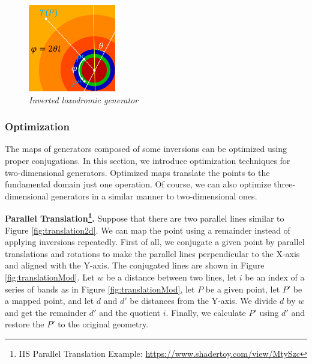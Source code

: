 \begin{figure}[h!tbp]
\begin{minipage}[t]{0.24\hsize}
   \label{fig:loxodromicMod}
 \end{minipage}
  \hspace*{\fill}
 \begin{minipage}[t]{0.24\hsize}
   \begin{center}
    \includegraphics[width=1.5in, height=1.5in, keepaspectratio]{./img/application/optimization/loxodromicModRotation.pdf}
   \end{center}
   \caption{\textit{Inverted loxodromic generator}}
   \label{fig:loxodromicRotationMod}
  \hspace*{\fill}
 \end{minipage}
\end{figure}


\subsubsection{Optimization}

 The maps of generators composed of some inversions
 can be optimized using proper conjugations.
 In this section, we introduce optimization techniques for two-dimensional
 generators.
 Optimized maps translate the points to the fundamental domain just one operation.
 Of course, we can also optimize three-dimensional generators in a similar manner to
 two-dimensional ones.

 \noindent\textbf{Parallel Translation\footnote{IIS Parallel Translation Example: \url{https://www.shadertoy.com/view/MtySzc}}.}
 Suppose that there are two parallel lines similar to Figure
 \ref{fig:translation2d}.
 We can map the point using a remainder instead of applying inversions
 repeatedly.
 First of all, we conjugate a given point by parallel translations and rotations to make the
 parallel lines perpendicular to the X-axis and aligned with the Y-axis.
 The conjugated lines are shown in Figure \ref{fig:translationMod}.
 Let $w$ be a distance between two lines, let $i$ be an index of a series
 of bands as in Figure \ref{fig:translationMod}, let $P$ be a given point, let
 $P'$ be a mapped point, and let $d$ and $d'$ be distances from the Y-axis.
 We divide $d$ by $w$ and get the remainder $d'$ and the
 quotient $i$.
 Finally, we calculate $P'$ using $d'$ and restore the $P'$ to the
 original geometry.

